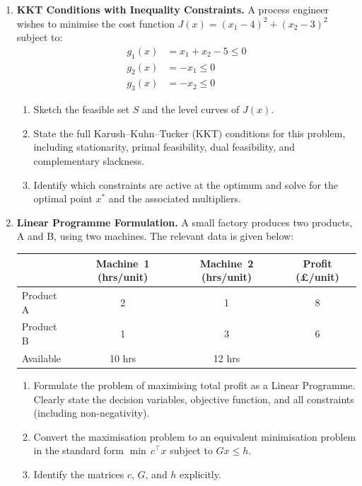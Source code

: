 \begin{enumerate}
	\item \textbf{KKT Conditions with Inequality Constraints.}
	A process engineer wishes to minimise the cost function $J(x) = (x_1 - 4)^2 + (x_2 - 3)^2$ subject to:
	\begin{equation*}
		\begin{aligned}
			g_1(x) &= x_1 + x_2 - 5 \leq 0 \\
			g_2(x) &= -x_1 \leq 0 \\
			g_3(x) &= -x_2 \leq 0
		\end{aligned}
	\end{equation*}
	\begin{enumerate}
		\item Sketch the feasible set $S$ and the level curves of $J(x)$.
		\item State the full Karush--Kuhn--Tucker (KKT) conditions for this problem, including stationarity, primal feasibility, dual feasibility, and complementary slackness.
		\item Identify which constraints are active at the optimum and solve for the optimal point $x^*$ and the associated multipliers.
	\end{enumerate}

	\item \textbf{Linear Programme Formulation.}
	A small factory produces two products, A and B, using two machines. The relevant data is given below:
	\begin{center}
		\begin{tabular}{lccc}
			\toprule
			& Machine~1 (hrs/unit) & Machine~2 (hrs/unit) & Profit (\pounds/unit) \\
			\midrule
			Product A & 2 & 1 & 8 \\
			Product B & 1 & 3 & 6 \\
			\midrule
			Available & 10 hrs & 12 hrs & \\
			\bottomrule
		\end{tabular}
	\end{center}
	\begin{enumerate}
		\item Formulate the problem of maximising total profit as a Linear Programme. Clearly state the decision variables, objective function, and all constraints (including non-negativity).
		\item Convert the maximisation problem to an equivalent minimisation problem in the standard form $\min\, c^\top x$ subject to $Gx \leq h$.
		\item Identify the matrices $c$, $G$, and $h$ explicitly.
	\end{enumerate}


\end{enumerate}
